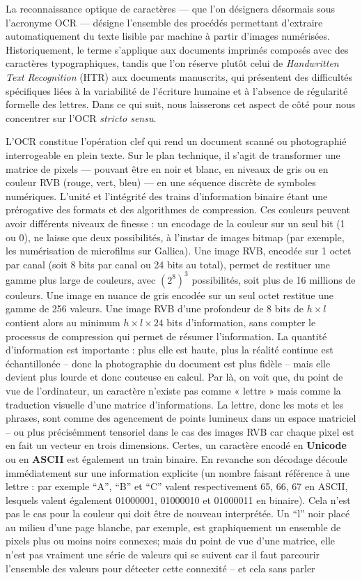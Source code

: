 La reconnaissance optique de caractères — que l’on désignera désormais sous l’acronyme OCR — désigne l’ensemble des procédés permettant d’extraire automatiquement du texte lisible par machine à partir d’images numérisées. Historiquement, le terme s’applique aux documents imprimés composés avec des caractères typographiques, tandis que l’on réserve plutôt celui de \emph{Handwritten Text Recognition} (HTR) aux documents manuscrits, qui présentent des difficultés spécifiques liées à la variabilité de l’écriture humaine et à l’absence de régularité formelle des lettres. Dans ce qui suit, nous laisserons cet aspect de côté pour nous concentrer sur l’OCR \emph{stricto sensu}.

L’OCR constitue l’opération clef qui rend un document scanné ou photographié interrogeable en plein texte. Sur le plan technique, il s’agit de transformer une matrice de pixels — pouvant être en noir et blanc, en niveaux de gris ou en couleur RVB (rouge, vert, bleu) — en une séquence discrète de symboles numériques. L'unité et l'intégrité des trains d'information binaire étant une prérogative des formats et des algorithmes de compression. Ces couleurs peuvent avoir différents niveaux de finesse : un encodage de la couleur sur un seul bit (1 ou 0), ne laisse que deux possibilités, à l'instar de images bitmap (par exemple, les numérisation de microfilms sur Gallica). Une image RVB, encodée sur 1 octet par canal (soit 8 bits par canal ou 24 bits au total), permet de restituer une gamme plus large de couleurs, avec $(2^8)^3$ possibilités, soit plus de 16 millions de couleurs. Une image en nuance de gris encodée sur un seul octet restitue une gamme de 256 valeurs. Une image RVB d'une profondeur de 8 bits de $h \times l$ contient alors au minimum $h \times l \times 24$ bits d'information, sans compter le processus de compression qui permet de résumer l'information. La quantité d'information est importante : plus elle est haute, plus la réalité continue est échantillonée -- donc la photographie du document est plus fidèle -- mais elle devient plus lourde et donc couteuse en calcul. Par là, on voit que, du point de vue de l’ordinateur, un caractère n’existe pas comme « lettre » mais comme la traduction visuelle d'une matrice d'informations. La lettre, donc les mots et les phrases, sont comme des agencement de points lumineux dans un espace matriciel -- ou plus précisémment tensoriel dans le cas des images RVB car chaque pixel est en fait un vecteur en trois dimensions. Certes, un caractère encodé en \textbf{Unicode} ou en \textbf{ASCII} est également un train binaire. En revanche son décodage découle immédiatement sur une information explicite (un nombre faisant référence à une lettre : par exemple \enquote{A}, \enquote{B} et \enquote{C} valent respectivement 65, 66, 67 en ASCII, lesquels valent également 01000001, 01000010 et 01000011 en binaire). Cela n'est pas le cas pour la couleur qui doit être de nouveau interprétée. Un \enquote{l} noir placé au milieu d'une page blanche, par exemple, est graphiquement un ensemble de pixels plus ou moins noirs connexes; mais du point de vue d'une matrice, elle n'est pas vraiment une série de valeurs qui se suivent car il faut parcourir l'ensemble des valeurs pour détecter cette connexité -- et cela sans parler 